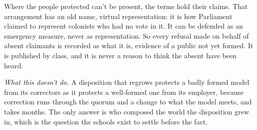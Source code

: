 Where the people protected can't be present, the terms hold their claims. That arrangement has an old name, virtual representation: it is how Parliament claimed to represent colonists who had no vote in it. It can be defended as an emergency measure, never as representation. So every refusal made on behalf of absent claimants is recorded as what it is, evidence of a public not yet formed. It is published by class, and it is never a reason to think the absent have been heard.

\emph{What this doesn't do.} A disposition that regrows protects a badly formed model from its correctors as it protects a well-formed one from its employer, because correction runs through the quorum and a change to what the model meets, and takes months. The only answer is who composed the world the disposition grew in, which is the question the schools exist to settle before the fact.
